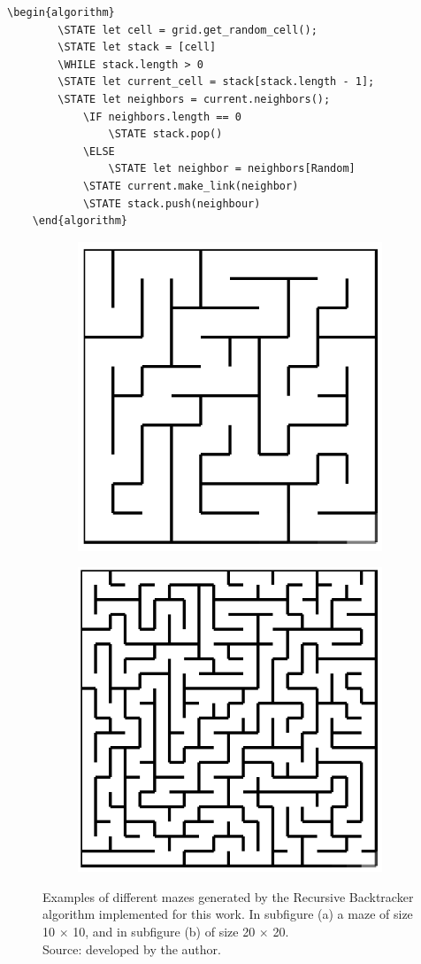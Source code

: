 \begin{lstlisting}[caption={Pseudocode for a Recursive-Backtracker algorithm. Source: developped by the author, based on~\cite{18}.}]
	\begin{algorithm}
		\STATE let cell = grid.get_random_cell();
		\STATE let stack = [cell]
		\WHILE stack.length > 0
		\STATE let current_cell = stack[stack.length - 1];
		\STATE let neighbors = current.neighbors();
			\IF neighbors.length == 0
				\STATE stack.pop()
			\ELSE 
				\STATE let neighbor = neighbors[Random]
			\STATE current.make_link(neighbor)
			\STATE stack.push(neighbour)	
	\end{algorithm}
	\end{lstlisting}
\newline
\begin{figure}[!h]
    \centering
    \begin{subfigure}{.45\textwidth}
    \centering
    \includegraphics[width=.6\linewidth]{recursive1010.png}
    \caption{}
    \label{fig:sub1}
    \end{subfigure}
    \begin{subfigure}{.45\textwidth}
    \centering
    \includegraphics[width=.6\linewidth]{recursive2020.png}
    \caption{}
    \label{fig:sub2}
    \end{subfigure}
    \caption{Examples of different mazes generated by the Recursive Backtracker algorithm implemented for this work.
	In subfigure (a) a maze of size 10 $\times$ 10, and in subfigure (b) of size 20 $\times$ 20.\\ Source: developed by the author.}
    \label{fig:test}
    \end{figure}
